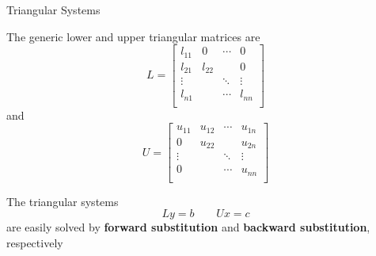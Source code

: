 \documentclass[10pt]{beamer}
\begin{document}
\begin{frame}{Triangular Systems}

The generic lower and upper triangular matrices are
\begin{equation*}
    L = \begin{bmatrix} l_{11} &   0    & \cdots &   0    \\
                        l_{21} & l_{22} &        &   0    \\
                        \vdots &        & \ddots & \vdots \\
                        l_{n1} &        & \cdots & l_{nn} \\
        \end{bmatrix}
\end{equation*}
and
\begin{equation*}
    U = \begin{bmatrix} u_{11} & u_{12} & \cdots & u_{1n} \\
                           0   & u_{22} &        & u_{2n}  \\
                        \vdots &        & \ddots & \vdots \\
                           0   &        & \cdots & u_{nn} \\
        \end{bmatrix}
\end{equation*}

The triangular systems
\begin{equation*}
    Ly = b \ \ \ \ \ \ \ \ \ Ux = c
\end{equation*}
are easily solved by \textbf{forward substitution} and
\textbf{backward substitution}, respectively

\end{frame}
\end{document}
